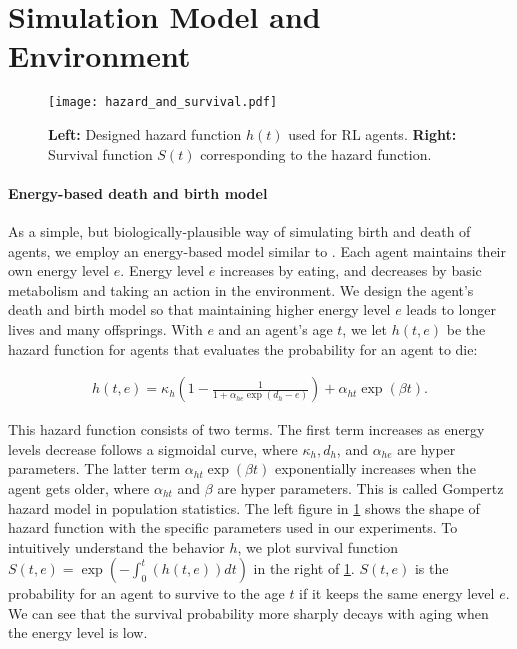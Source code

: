 \section{Simulation Model and Environment}\label{sec:method}

\begin{figure}[t]
  \centering{}
  \texttt{[image: hazard\_and\_survival.pdf]}
  \caption{
    \textbf{Left:} Designed hazard function $h(t)$ used for RL agents.
    \textbf{Right:} Survival function $S(t)$ corresponding to the hazard function.
  }\label{figure:hs}
\end{figure}

\paragraph{Energy-based death and birth model}
As a simple, but biologically-plausible way of simulating birth and death of agents, we employ an energy-based model similar to \citet{hamonEcoevolutionaryDynamicsNonepisodic2023}. Each agent maintains their own energy level $e$. Energy level $e$ increases by eating, and decreases by basic metabolism and taking an action in the environment. We design the agent's death and birth model so that maintaining higher energy level $e$ leads to longer lives and many offsprings. With $e$ and an agent's age $t$, we let $h(t, e)$ be the hazard function for agents that evaluates the probability for an agent to die:

\begin{align}
  h(t, e) = \kappa_{h} \left(1 - \frac{1}{1 + \alpha_{he} \exp(d_{h} - e)} \right) + \alpha_{ht} \exp(\beta t). \label{eq:h}
\end{align}

This hazard function\label{eq:h} consists of two terms. The first term increases as energy levels decrease follows a sigmoidal curve, where $\kappa_{h}, d_{h}$, and $\alpha_{he}$ are hyper parameters. The latter term $\alpha_{ht} \exp(\beta t)$ exponentially increases when the agent gets older, where $\alpha_{ht}$ and $\beta$ are hyper parameters. This is called Gompertz hazard model\citep{gompertzXXIVNatureFunction1825,kirkwoodDecipheringDeathCommentary2015} in population statistics. The left figure in \cref{figure:hs} shows the shape of hazard function with the specific parameters used in our experiments. To intuitively understand the behavior $h$, we plot survival function $S(t, e) = \exp (-\int_{0}^{t}(h(t, e)) dt)$ in the right of \cref{figure:hs}. $S(t, e)$ is the probability for an agent to survive to the age $t$ if it keeps the same energy level $e$. We can see that the survival probability more sharply decays with aging when the energy level is low.

